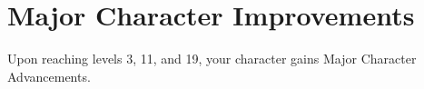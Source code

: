 \section{Major Character Improvements} \label{sec::majorcharacterimprovements}
Upon reaching levels 3, 11, and 19, your character gains Major Character Advancements.
